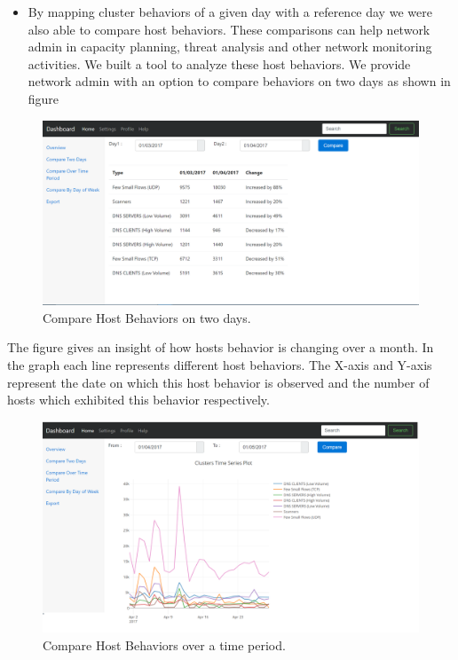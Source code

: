 \begin{itemize}
\item  By mapping cluster behaviors of a given day with a reference day we were also able
to compare host behaviors. These comparisons can help network admin in capacity
planning, threat analysis and other network monitoring activities. We built a tool to analyze these host behaviors. 
We provide network admin with an option to compare
behaviors on two days as shown in figure 


\end{itemize}

 

\begin{figure}[t]
	\centerline{\includegraphics[scale = 0.45]{tool_compare_days.png}}
	\caption{Compare Host Behaviors on two days.}%
\end{figure} 

The figure  gives an insight of how hosts behavior is changing over a month.
In the graph each line represents different host behaviors. The X-axis and Y-axis
represent the date on which this host behavior is observed and the number of hosts
which exhibited this behavior respectively.

\begin{figure}[t]
	\centerline{\includegraphics[scale = 0.45]{tool_compare_week.png}}
	\caption{Compare Host Behaviors over a time period.}%
\end{figure} 



